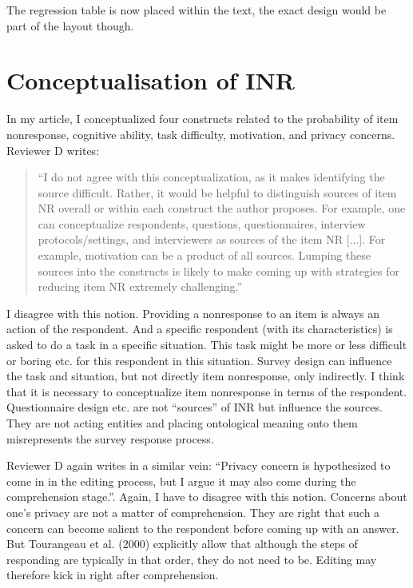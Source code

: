 \documentclass[a4paper, 12pt]{article}
\begin{document}
The regression table is now placed within the text, the exact design would be part of the layout though.


\section{Conceptualisation of INR}

In my article, I conceptualized four constructs related to the probability of item nonresponse, cognitive ability, task difficulty, motivation, and privacy concerns. Reviewer D writes:

\begin{quotation}
``I do not agree with this conceptualization, as it makes identifying the source difficult. Rather, it would be helpful to distinguish sources of item NR overall or within each construct the author proposes. For example, one can conceptualize respondents, questions, questionnaires, interview protocols/settings, and interviewers as sources of the item NR [...]. For example, motivation can be a product of all sources. Lumping these sources into the constructs is likely to make coming up with strategies for reducing item NR extremely challenging.''
\end{quotation}

I disagree with this notion. Providing a nonresponse to an item is always an action of the respondent. And a specific respondent (with its characteristics) is asked to do a task in a specific situation. This task might be more or less difficult or boring etc. for this respondent in this situation. Survey design can influence the task and situation, but not directly item nonresponse, only indirectly. I think that it is necessary to conceptualize item nonresponse in terms of the respondent. Questionnaire design etc. are not ``sources'' of INR but influence the sources. They are not acting entities and placing ontological meaning onto them misrepresents the survey response process.

Reviewer D again writes in a similar vein: ``Privacy concern is hypothesized to come in in the editing process, but I argue it may also come during the comprehension stage.''. Again, I have to disagree with this notion. Concerns about one's privacy are not a matter of comprehension. They are right that such a concern can become salient to the respondent before coming up with an answer. But Tourangeau et al. (2000) explicitly allow that although the steps of responding are typically in that order, they do not need to be. Editing may therefore kick in right after comprehension.
\end{document}
